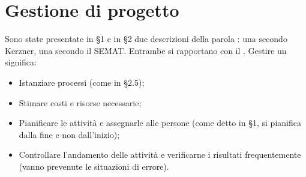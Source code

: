 \documentclass[../main]{subfiles}
\begin{document}
\section{Gestione di progetto}
Sono state presentate in §1 e in §2 due descrizioni della parola : una secondo Kerzner, una secondo il SEMAT. Entrambe si rapportano con il .
Gestire un  significa:
\begin{itemize}
    \item Istanziare processi (come in §2.5);
    \item Stimare costi e risorse necessarie;
    \item Pianificare le attività e assegnarle alle persone (come detto in §1, si pianifica dalla fine e non dall'inizio);
    \item Controllare l'andamento delle attività e verificarne i risultati frequentemente (vanno prevenute le situazioni di errore).
\end{itemize}
\end{document}

